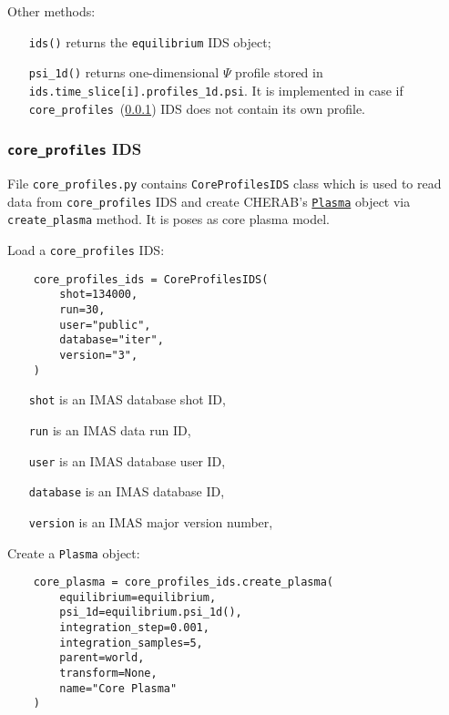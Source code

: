 \documentclass[../../main.tex]{subfiles}
\begin{document}
Other methods:
\begin{itemize}[align=left]
    \item[\texttt{ids()}] returns the \texttt{equilibrium} IDS object;
    \item[\texttt{psi\_1d()}] returns one-dimensional $\Psi$ profile stored in \texttt{ids.time\_slice[i].profiles\_1d.psi}. It is implemented in case if \texttt{core\_profiles}~(\cref{sec:core_profiles_ids}) IDS does not contain its own profile.
\end{itemize}

\subsubsection{\texttt{core\_profiles} IDS}%
\label{sec:core_profiles_ids}

File \texttt{core\_profiles.py} contains \texttt{CoreProfilesIDS} class which is used to read data from \texttt{core\_profiles} IDS and create CHERAB's \href{https://cherab.github.io/documentation/plasmas/core_plasma_classes.html?highlight=plasma#cherab.core.Plasma}{\texttt{Plasma}} object via \texttt{create\_plasma} method. It is poses as core plasma model.

Load a \texttt{core\_profiles} IDS:
\begin{verbatim}
    core_profiles_ids = CoreProfilesIDS(
        shot=134000,
        run=30,
        user="public",
        database="iter",
        version="3",
    )
\end{verbatim}

\begin{itemize}[align=left]
    \item[\texttt{shot}] is an IMAS database shot ID,
    \item[\texttt{run}] is an IMAS data run ID,
    \item[\texttt{user}] is an IMAS database user ID,
    \item[\texttt{database}] is an IMAS database ID,
    \item[\texttt{version}] is an IMAS major version number,
\end{itemize}

Create a \texttt{Plasma} object:
\begin{verbatim}
    core_plasma = core_profiles_ids.create_plasma(
        equilibrium=equilibrium,
        psi_1d=equilibrium.psi_1d(),
        integration_step=0.001,
        integration_samples=5,
        parent=world,
        transform=None,
        name="Core Plasma"
    )
\end{verbatim}
\end{document}
